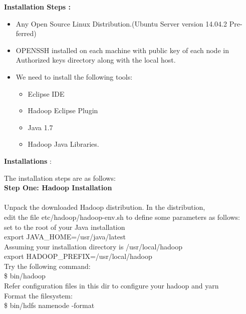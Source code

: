 \documentclass[oneside,a4paper,12pt]{report}
\begin{document}
{\begin{appendices}
\noindent \textbf{Installation Steps : }
\begin{itemize}
\item Any Open Source Linux Distribution.(Ubuntu Server version 14.04.2 Pre-ferred)
\item OPENSSH installed on each machine with public key of each node in Authorized keys directory along with the local host.
\item We need to install the following tools:
	\begin{itemize}
		\item Eclipse IDE
		\item Hadoop Eclipse Plugin
		\item Java 1.7
		\item Hadoop Java Libraries. 
	\end{itemize}
\end{itemize}


\noindent \textbf{Installations} :

\noindent The installation steps are as follows:\\

\noindent \textbf{Step One: Hadoop Installation} \\\\
Unpack the downloaded Hadoop distribution. In the distribution,\\
edit the file etc/hadoop/hadoop-env.sh to define some parameters as follows: \\

\noindent set to the root of your Java installation \\
  export JAVA\_HOME=/usr/java/latest \\

\noindent Assuming your installation directory is /usr/local/hadoop \\
  export HADOOP\_PREFIX=/usr/local/hadoop \\

\noindent Try the following command: \\

  \$ bin/hadoop \\


\noindent Refer configuration files in this dir to configure your hadoop and yarn \\
  
\noindent Format the filesystem: \\

  \$ bin/hdfs namenode -format \\


\end{appendices}}
\end{document}
